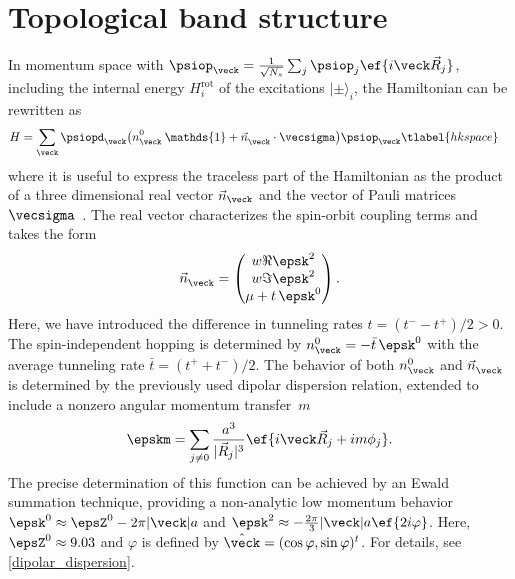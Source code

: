 \section{Topological band structure}
In momentum space with $\psiop_{\veck}=\frac{1}{\sqrt{N_s}}\sum_{j} \psiop_{j}\ef{i\veck\vec{R}_j}$, including the internal energy $H_{i}^{\text{rot}}$ of the excitations $|\pm\rangle_{i}$, the Hamiltonian  can be rewritten as
\begin{align}
    H &= \sum_{\veck} \psiopd_{\veck} \big({n^{0\vphantom\dagger}_{\veck} \: \mathds{1} + \vec{n}^{\vphantom \dagger}_{\veck}\cdot\vecsigma}\big) \psiop_{\veck}
    \tlabel{hkspace}
\end{align}
where it is useful to express the traceless part of the Hamiltonian
as the product of a three dimensional real vector $\vec{n}_{\veck}$ and the vector of Pauli matrices $\vecsigma$~\cite{Hasan2010,Bernevig2013}.
The real vector characterizes the spin-orbit coupling terms and takes the form
\begin{align}
    \vec{n}^{\vphantom 0}_{\veck} = \begin{pmatrix}
        w \Re \epsk^2 \\
        w \Im \epsk^2 \\
        \mu + t\, \epsk^0
    \end{pmatrix}.
\end{align}
Here, we have introduced the difference in tunneling rates $t = (t^--t^+)/2 > 0$.
The spin-independent hopping is determined by $n^0_{\veck} = -\bar{t}\, \epsk^0$ with the average tunneling rate ${\bar t} = (t^{+}+t^{-})/2$.
The behavior of both $n^0_\veck$ and $\vec{n}^{\vphantom 0}_\veck$ is determined by the previously used dipolar dispersion relation, extended to include a nonzero angular momentum transfer~$m$~\cite{Muller2010,Peter2012b,Syzranov2014,Peter2014}
\begin{align}
    \epskm = \sum_{j\ne 0} \frac{a^3}{|\vec{R}_j|^3}\ef{i\veck \vec{R}_j + i m \phi_{j}}.
\end{align}
The precise determination of this function can be achieved by an Ewald summation technique, providing a non-analytic low momentum behavior
$\epsk^0 \approx \epsZ^0 - 2\pi |\veck|a$ and
$\epsk^2 \approx -\frac{2\pi}{3} |\veck|a \ef{2i \varphi}$.
Here, $\epsZ^0 \approx 9.03$ and $\varphi$ is defined by $\hat{\veck}=(\cos \varphi, \sin \varphi)^t$.
For details, see \cref{dipolar_dispersion}.


